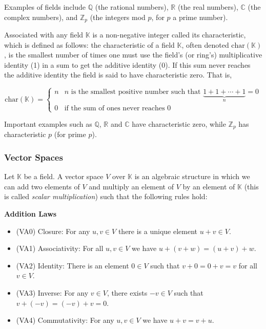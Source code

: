 \documentclass{article}
\theoremstyle{definition}
\begin{document}
\bigskip
\noindent
Examples of fields include $\mathbb{Q}$ (the rational numbers), 
$\mathbb{R}$ (the real numbers), $\mathbb{C}$ (the complex numbers), 
and $\mathbb{Z}_{p}$ (the integers mod $p$, for $p$ a prime number).

\bigskip
\noindent
Associated with any field $\mathbb{K}$ is a non-negative integer called its 
characteristic, which is defined as follows: the characteristic of a field 
$\mathbb{K}$, often denoted $\text{char} (\mathbb{K})$, is the smallest number 
of times one must use the field's (or ring's) multiplicative identity (1) in 
a sum to get the additive identity (0). If this sum never reaches the additive 
identity the field is said to have characteristic zero. That is, 

\bigskip
\begin{equation*}
\text{char}(\mathbb{K}) = 
    \begin{cases}
        n & \text{$n$ is the smallest positive number such that } 
              \underbrace{1+1+ \cdots + 1}_{n} = 0 \\
        0 & \text{if the sum of ones never reaches 0}
    \end{cases}
\end{equation*}

\bigskip
\noindent
Important examples such as $\mathbb{Q}$, $\mathbb{R}$ and $\mathbb{C}$ 
have characteristic zero, while $\mathbb{Z}_{p}$ has characteristic $p$
(for prime $p$).

\bigskip
\subsubsection*{\large Vector Spaces}
Let $\mathbb{K}$ be a field. A vector space $V$ over $\mathbb{K}$ is an algebraic 
structure in which we can add two elements of $V$ and multiply an element of $V$
by an element of $\mathbb{K}$ (this is called \emph{scalar multiplication}) such 
that the following rules hold:

\bigskip
{\bf Addition Laws}
\smallskip
\begin{itemize}
\item [] (VA0) Closure: For any $u,v \in V$ there is a unique element $u+v \in V$.
\item [] (VA1) Associativity: For all $u,v \in V$ we have $u+(v+w)=(u+v)+w$.
\item [] (VA2) Identity: There is an element $0 \in V$ such that $v+0=0+v=v$ for all $v \in V$. 
\item [] (VA3) Inverse: For any $v \in V$, there exists $-v \in V$ such that $v+(-v)=(-v)+v=0$.
\item [] (VA4) Commutativity: For any $u,v \in V$ we have $u+v=v+u$.
\end{itemize}
\end{document}
